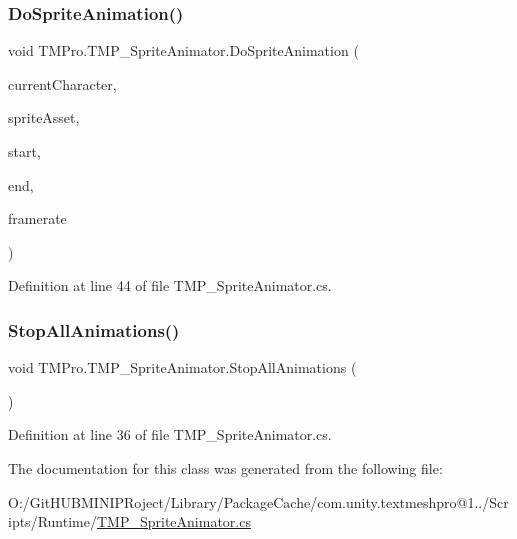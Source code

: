 \subsubsection{\texorpdfstring{DoSpriteAnimation()}{DoSpriteAnimation()}}
{\footnotesize\ttfamily void T\+M\+Pro.\+T\+M\+P\+\_\+\+Sprite\+Animator.\+Do\+Sprite\+Animation (\begin{DoxyParamCaption}\item[{int}]{current\+Character,  }\item[{\mbox{\hyperlink{class_t_m_pro_1_1_t_m_p___sprite_asset}{T\+M\+P\+\_\+\+Sprite\+Asset}}}]{sprite\+Asset,  }\item[{int}]{start,  }\item[{int}]{end,  }\item[{int}]{framerate }\end{DoxyParamCaption})}



Definition at line 44 of file T\+M\+P\+\_\+\+Sprite\+Animator.\+cs.

\mbox{\label{class_t_m_pro_1_1_t_m_p___sprite_animator_ade0c942998e861854cd24c280c679320}} 
\subsubsection{\texorpdfstring{StopAllAnimations()}{StopAllAnimations()}}
{\footnotesize\ttfamily void T\+M\+Pro.\+T\+M\+P\+\_\+\+Sprite\+Animator.\+Stop\+All\+Animations (\begin{DoxyParamCaption}{ }\end{DoxyParamCaption})}



Definition at line 36 of file T\+M\+P\+\_\+\+Sprite\+Animator.\+cs.



The documentation for this class was generated from the following file\+:\begin{DoxyCompactItemize}
\item 
O\+:/\+Git\+H\+U\+B\+M\+I\+N\+I\+P\+Roject/\+Library/\+Package\+Cache/com.\+unity.\+textmeshpro@1../\+Scripts/\+Runtime/\mbox{\hyperlink{_t_m_p___sprite_animator_8cs}{T\+M\+P\+\_\+\+Sprite\+Animator.\+cs}}\end{DoxyCompactItemize}
